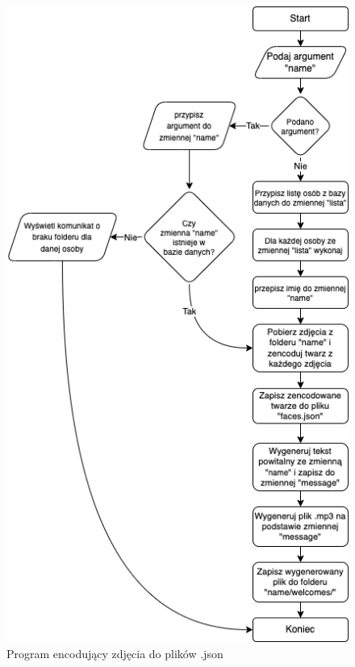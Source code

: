 \documentclass[a4paper,12pt,reqno]{article}
\begin{document}
\begin{figure}[H]%
\centering
\includegraphics[width=0.7\columnwidth]{imgs/generujacy.drawio.png}
\caption{Program encodujący zdjęcia do plików .json \cite{img_by_me} \label{algorytm_encode_faces}}
\quad
\end{figure}
\end{document}
